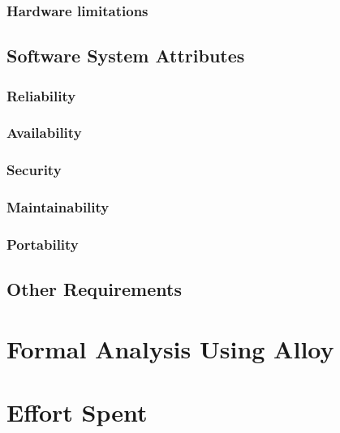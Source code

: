 \documentclass[a4paper,12pt]{book}
\begin{document}
\subsection{Hardware limitations}

\newpage
\section{Software System Attributes}
\subsection{Reliability}
\subsection{Availability}
\subsection{Security}
\subsection{Maintainability}
\subsection{Portability}

\newpage
\section{Other Requirements}

\chapter{Formal Analysis Using Alloy}


\chapter{Effort Spent}
\end{document}
